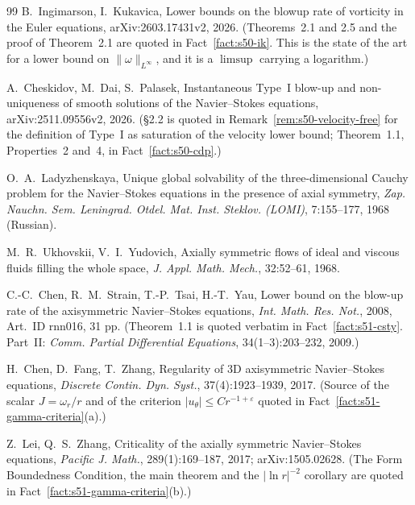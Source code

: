 \documentclass[11pt]{article}
\theoremstyle{definition}
\theoremstyle{remark}
\begin{document}
\begin{thebibliography}{99}
  B.~Ingimarson, I.~Kukavica,
  Lower bounds on the blowup rate of vorticity in the Euler equations,
  arXiv:2603.17431v2, 2026.
  (Theorems~2.1 and 2.5 and the proof of Theorem~2.1 are quoted in
  Fact~\ref{fact:s50-ik}. This is the state of the art for a lower bound on
  $\|\omega\|_{L^\infty}$, and it is a $\limsup$ carrying a logarithm.)

  A.~Cheskidov, M.~Dai, S.~Palasek,
  Instantaneous Type~I blow-up and non-uniqueness of smooth solutions of the
  Navier--Stokes equations,
  arXiv:2511.09556v2, 2026.
  (\S2.2 is quoted in Remark~\ref{rem:s50-velocity-free} for the definition
  of Type~I as saturation of the velocity lower bound; Theorem~1.1,
  Properties~2 and~4, in Fact~\ref{fact:s50-cdp}.)



  O.~A.~Ladyzhenskaya,
  Unique global solvability of the three-dimensional Cauchy problem for the
  Navier--Stokes equations in the presence of axial symmetry,
  \emph{Zap. Nauchn. Sem. Leningrad. Otdel. Mat. Inst. Steklov. (LOMI)},
  7:155--177, 1968 (Russian).

  M.~R.~Ukhovskii, V.~I.~Yudovich,
  Axially symmetric flows of ideal and viscous fluids filling the whole space,
  \emph{J. Appl. Math. Mech.}, 32:52--61, 1968.

  C.-C.~Chen, R.~M.~Strain, T.-P.~Tsai, H.-T.~Yau,
  Lower bound on the blow-up rate of the axisymmetric Navier--Stokes
  equations,
  \emph{Int. Math. Res. Not.}, 2008, Art.~ID rnn016, 31 pp.
  (Theorem~1.1 is quoted verbatim in Fact~\ref{fact:s51-csty}. Part~II:
  \emph{Comm. Partial Differential Equations}, 34(1--3):203--232, 2009.)

  H.~Chen, D.~Fang, T.~Zhang,
  Regularity of 3D axisymmetric Navier--Stokes equations,
  \emph{Discrete Contin. Dyn. Syst.}, 37(4):1923--1939, 2017.
  (Source of the scalar $J=\omega_r/r$ and of the criterion
  $|u_\theta|\leq Cr^{-1+\varepsilon}$ quoted in
  Fact~\ref{fact:s51-gamma-criteria}(a).)

  Z.~Lei, Q.~S.~Zhang,
  Criticality of the axially symmetric Navier--Stokes equations,
  \emph{Pacific J. Math.}, 289(1):169--187, 2017; arXiv:1505.02628.
  (The Form Boundedness Condition, the main theorem and the
  $|\ln r|^{-2}$ corollary are quoted in
  Fact~\ref{fact:s51-gamma-criteria}(b).)


\end{thebibliography}
\end{document}
